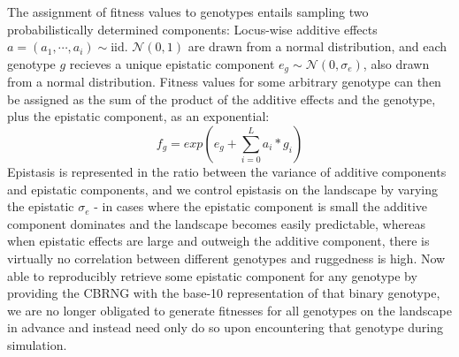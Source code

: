 \documentclass[paper=a4, fontsize=11pt,twoside]{scrartcl}       %
\begin{document}
The assignment of fitness values to genotypes entails sampling two probabilistically determined components: Locus-wise additive effects $a = (a_1, \cdots, a_i) \sim \text{iid. } \mathcal{N}(0, 1)$ are drawn from a normal distribution, and each genotype $g$ recieves a unique epistatic component $e_g \sim \mathcal{N}(0, \sigma_e)$, also drawn from a normal distribution.  Fitness values for some arbitrary genotype can then be assigned as the sum of the product of the additive effects and the genotype, plus the epistatic component, as an exponential: $$f_g = exp{(e_g + \sum_{i=0}^{L} a_i * g_i)}$$ Epistasis is represented in the ratio between the variance of additive components and epistatic components, and we control epistasis on the landscape by varying the epistatic $\sigma_e$ - in cases where the epistatic component is small the additive component dominates and the landscape becomes easily predictable, whereas when epistatic effects are large and outweigh the additive component, there is virtually no correlation between different genotypes and ruggedness is high. Now able to reproducibly retrieve some epistatic component for any genotype by providing the CBRNG with the base-10 representation of that binary genotype, we are no longer obligated to generate fitnesses for all genotypes on the landscape in advance and instead need only do so upon encountering that genotype during simulation.
\end{document}
